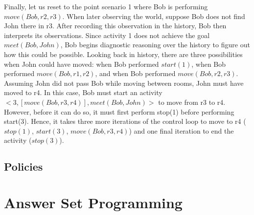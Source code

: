 Finally, let us reset to the point scenario 1 where Bob is performing $move(Bob, r2, r3)$.
When later observing the world, suppose Bob does not find John there in r3.
After recording this observation in the history, Bob then interprets its observations.
Since activity 1 does not achieve the goal $meet(Bob, John)$, Bob begins diagnostic reasoning over the history to figure out how this could be possible.
Looking back in history, there are three possibilities when John could have moved: when Bob performed $start(1)$, when Bob performed $move(Bob, r1, r2)$, and when Bob performed $move(Bob, r2, r3)$.
Assuming John did not pass Bob while moving between rooms, John must have moved to r4.
In this case, Bob must start an activity $<3, [move(Bob, r3, r4)],meet(Bob,John)>$ to move from r3 to r4.
However, before it can do so, it must first perform stop(1) before performing start(3).
Hence, it takes three more iterations of the control loop to move to r4 ($stop(1)$, $start(3)$, $move(Bob, r3,r4)$) and one final iteration to end the activity ($stop(3)$).

\subsection{Policies}
\label{subsec:policies}

\section{Answer Set Programming}
\label{sec:asp}
